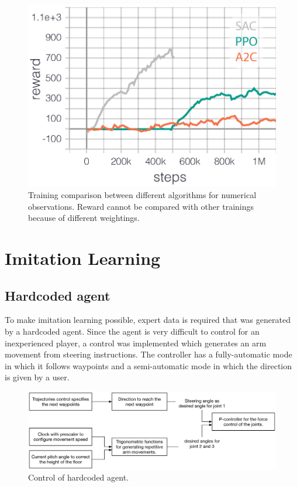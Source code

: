 \documentclass[conference]{IEEEtran}
\begin{document}
\begin{figure}[!t]
  \centering
  \includegraphics[width=0.8\linewidth]{images/Trainings_algorithm_comparison.eps}
  \caption{Training comparison between different algorithms for numerical observations. Reward cannot be compared with other trainings because of different weightings.}
\label{fig:PPO_and_A2C}
\end{figure}


\section{Imitation Learning}
\subsection{Hardcoded agent} \label{Hardcoded_agent}
To make imitation learning possible, expert data is required that was generated by a hardcoded agent. Since the agent is very difficult to control for an inexperienced player, a control was implemented which generates an arm movement from steering instructions. The controller has a fully-automatic mode in which it follows waypoints and a semi-automatic mode in which the direction is given by a user.

\begin{figure}[!t]
  \centering
  \includegraphics[width=1.0\linewidth]{images/Hardcoded_agent.eps}
  \caption{Control of hardcoded agent.}
\label{fig:Hardcoded_agent_control}
\end{figure}
\end{document}
